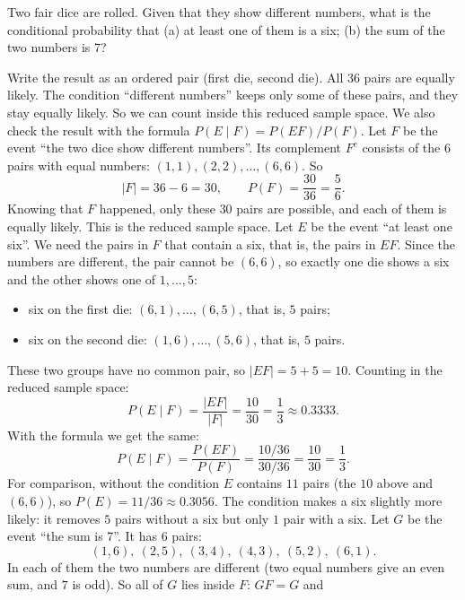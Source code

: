 
\begin{problem}
	Two fair dice are rolled. Given that they show different numbers, what is
	the conditional probability that (a) at least one of them is a six;
	(b) the sum of the two numbers is 7?
\end{problem}

\begin{solution}
	\idea Write the result as an ordered pair (first die, second die). All
	$36$ pairs are equally likely. The condition ``different numbers'' keeps
	only some of these pairs, and they stay equally likely. So we can count
	inside this reduced sample space. We also check the result with the
	formula $P(E\mid F)=P(EF)/P(F)$.
	 Let $F$ be the event ``the two dice show different
	numbers''. Its complement $F^c$ consists of the $6$ pairs with equal
	numbers: $(1,1),(2,2),\dots,(6,6)$. So
	\[ |F|=36-6=30, \qquad P(F)=\frac{30}{36}=\frac56. \]
	Knowing that $F$ happened, only these $30$ pairs are possible, and each of
	them is equally likely. This is the reduced sample space.
	 Let $E$ be the event ``at least one six''. We need the pairs in
	$F$ that contain a six, that is, the pairs in $EF$. Since the numbers are
	different, the pair cannot be $(6,6)$, so exactly one die shows a six and
	the other shows one of $1,\dots,5$:
	\begin{itemize}
		\item six on the first die: $(6,1),\dots,(6,5)$, that is, $5$ pairs;
		\item six on the second die: $(1,6),\dots,(5,6)$, that is, $5$ pairs.
	\end{itemize}
	These two groups have no common pair, so $|EF|=5+5=10$. Counting in the
	reduced sample space:
	\[ P(E\mid F)=\frac{|EF|}{|F|}=\frac{10}{30}=\frac13\approx0.3333. \]
	With the formula we get the same:
	\[ P(E\mid F)=\frac{P(EF)}{P(F)}=\frac{10/36}{30/36}=\frac{10}{30}=\frac13. \]
	For comparison, without the condition $E$ contains $11$ pairs (the $10$
	above and $(6,6)$), so $P(E)=11/36\approx0.3056$. The condition makes a six
	slightly more likely: it removes $5$ pairs without a six but only $1$ pair
	with a six.
	 Let $G$ be the event ``the sum is 7''. It has $6$ pairs:
	\[ (1,6),\ (2,5),\ (3,4),\ (4,3),\ (5,2),\ (6,1). \]
	In each of them the two numbers are different (two equal numbers give an
	even sum, and $7$ is odd). So all of $G$ lies inside $F$: $GF=G$ and

\end{solution}
